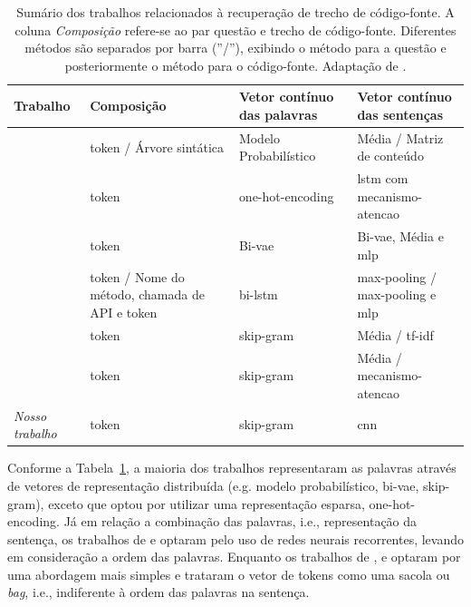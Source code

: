 \begin{table}[H]
\centering

\begin{tabular}{ l p{3cm} p{3cm} p{3cm} }
 \hline
 \textbf{Trabalho} & \textbf{Composição} & \textbf{Vetor contínuo das palavras} & \textbf{Vetor contínuo das sentenças} \\
 \hline
\citep{Allamanis-bimodal-source-code-natural-language:2015} & \Gls{token} / Árvore sintática & Modelo Probabilístico & Média / Matriz de conteúdo  \\

\citep{iyer-etal-2016-summarizing} & \Gls{token} & \Gls{one-hot-encoding} & \acrshort{lstm} com \gls{mecanismo-atencao}  \\

\citep{Chen-bi-variational-autoencoder:2018} & \Gls{token} & Bi-\acrshort{vae} & Bi-\acrshort{vae}, Média e \acrshort{mlp}  \\

\citep{Gu-deep-code-search:2018} & \Gls{token} / Nome do método, chamada de API e \Gls{token} & bi-\acrshort{lstm} & \Gls{max-pooling} / \Gls{max-pooling} e \acrshort{mlp}   \\

\citep{Sachdev-neural-code-search:2018} & \Gls{token} & \Gls{skip-gram} & Média / \acrshort{tf-idf}   \\

\citep{cambronero-deep-learning-code-search:2019} & \Gls{token} & \Gls{skip-gram} & Média / \Gls{mecanismo-atencao}   \\

\textit{Nosso trabalho} & \Gls{token} & \Gls{skip-gram} & \acrshort{cnn}   \\

 \hline
\end{tabular}
\caption{Sumário dos trabalhos relacionados à recuperação de trecho de código-fonte. A coluna \emph{Composição} refere-se ao par questão e trecho de código-fonte. Diferentes métodos são separados por barra (''/''), exibindo o método para a questão e posteriormente o método para o código-fonte. Adaptação de \cite{yan-benchmark-code-search-information-retrieval-deep-learning:2020}.}
\label{table:summary-joint-embedding}
\end{table}

Conforme a Tabela~\ref{table:summary-joint-embedding}, a maioria dos trabalhos representaram as palavras através de vetores de representação distribuída (e.g. modelo probabilístico, bi-\acrshort{vae}, \gls{skip-gram}), exceto \cite{iyer-etal-2016-summarizing} que optou por utilizar uma representação esparsa, \gls{one-hot-encoding}. Já em relação a combinação das palavras, i.e., representação da sentença, os trabalhos de \cite{Gu-deep-code-search:2018} e \cite{iyer-etal-2016-summarizing} optaram pelo uso de redes neurais recorrentes, levando em consideração a ordem das palavras. Enquanto os trabalhos de \cite{Chen-bi-variational-autoencoder:2018}, \cite{Sachdev-neural-code-search:2018} e \cite{cambronero-deep-learning-code-search:2019} optaram por uma abordagem mais simples e trataram o vetor de tokens como uma sacola ou \textit{bag}, i.e., indiferente à ordem das palavras na sentença.

